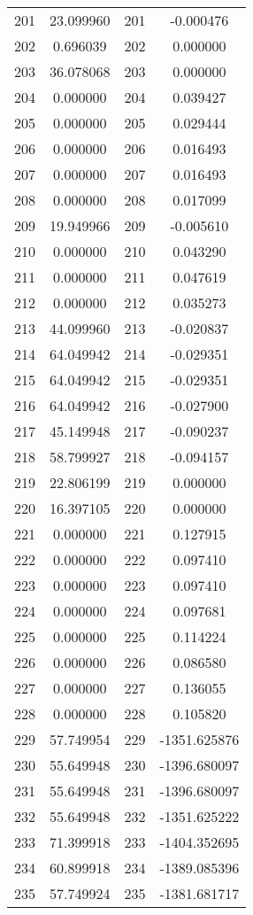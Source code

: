 \documentclass[12pt]{article}
\begin{document}
\begin{longtable}{@{}cccc@{}}
201 & 23.099960 & 201 & -0.000476 \\
202 & 0.696039 & 202 & 0.000000 \\
203 & 36.078068 & 203 & 0.000000 \\
204 & 0.000000 & 204 & 0.039427 \\
205 & 0.000000 & 205 & 0.029444 \\
206 & 0.000000 & 206 & 0.016493 \\
207 & 0.000000 & 207 & 0.016493 \\
208 & 0.000000 & 208 & 0.017099 \\
209 & 19.949966 & 209 & -0.005610 \\
210 & 0.000000 & 210 & 0.043290 \\
211 & 0.000000 & 211 & 0.047619 \\
212 & 0.000000 & 212 & 0.035273 \\
213 & 44.099960 & 213 & -0.020837 \\
214 & 64.049942 & 214 & -0.029351 \\
215 & 64.049942 & 215 & -0.029351 \\
216 & 64.049942 & 216 & -0.027900 \\
217 & 45.149948 & 217 & -0.090237 \\
218 & 58.799927 & 218 & -0.094157 \\
219 & 22.806199 & 219 & 0.000000 \\
220 & 16.397105 & 220 & 0.000000 \\
221 & 0.000000 & 221 & 0.127915 \\
222 & 0.000000 & 222 & 0.097410 \\
223 & 0.000000 & 223 & 0.097410 \\
224 & 0.000000 & 224 & 0.097681 \\
225 & 0.000000 & 225 & 0.114224 \\
226 & 0.000000 & 226 & 0.086580 \\
227 & 0.000000 & 227 & 0.136055 \\
228 & 0.000000 & 228 & 0.105820 \\
229 & 57.749954 & 229 & -1351.625876 \\
230 & 55.649948 & 230 & -1396.680097 \\
231 & 55.649948 & 231 & -1396.680097 \\
232 & 55.649948 & 232 & -1351.625222 \\
233 & 71.399918 & 233 & -1404.352695 \\
234 & 60.899918 & 234 & -1389.085396 \\
235 & 57.749924 & 235 & -1381.681717 \\

\end{longtable}
\end{document}

